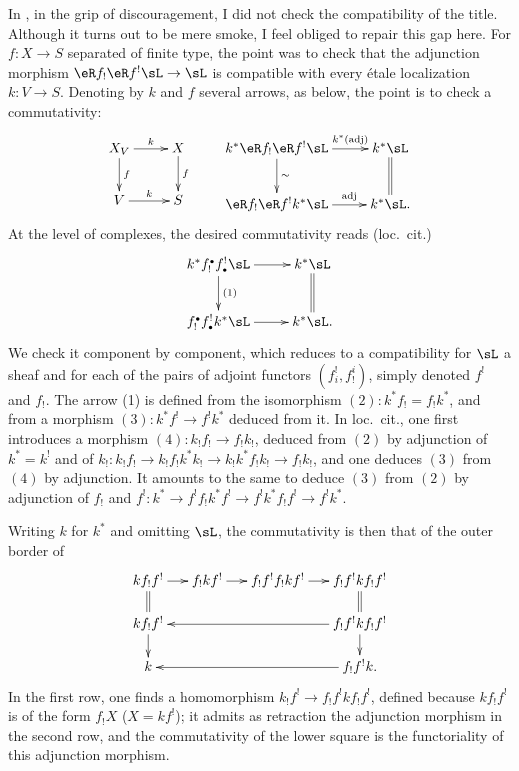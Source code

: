 In \cite[XVIII]{sga4}, in the grip of discouragement, I did not check
the compatibility of the title. Although it turns out to be mere smoke, I feel
obliged to repair this gap here. For $f:X\to S$ separated of finite
type, the point was to check that the adjunction morphism
$\eR f_!\eR f^!\sL\to \sL$ is compatible with every \'etale localization
$k:V\to S$. Denoting by $k$ and $f$ several arrows, as below,
the point is to check a commutativity:
\[\xymatrix{
  X_V \ar[r]^-k \ar[d]^-f
    & X \ar[d]^-f \\
  V \ar[r]^-k
    & S
} \qquad
\xymatrix{
  k^\ast \eR f_! \eR f^!\sL \ar[r]^-{k^\ast(\text{adj})} \ar[d]^-\sim
    & k^\ast \sL \ar@{=}[d] \\
  \eR f_! \eR f^! k^\ast \sL \ar[r]^-{\text{adj}}
    & k^\ast \sL \text{.}
}\]
At the level of complexes, the desired commutativity reads (loc.\ cit.)
\[\xymatrix{
  k^\ast f_!^\bullet f^!_\bullet \sL \ar[r] \ar[d]^-{(1)}
    & k^\ast \sL \ar@{=}[d] \\
  f_!^\bullet f^!_\bullet k^\ast \sL \ar[r]
    & k^\ast \sL \text{.}
}\]
We check it component by component, which reduces to a
compatibility for $\sL$ a sheaf and for each of the pairs of adjoint
functors $(f_i^!,f_!^i)$, simply denoted $f^!$ and $f_!$. The arrow (1)
is defined from the isomorphism $(2):k^\ast f_!=f_! k^\ast$, and from a
morphism $(3):k^\ast f^! \to f^! k^\ast$ deduced from it. In loc.\ cit., one
first introduces a morphism $(4):k_! f_!\to f_! k_!$, deduced from $(2)$ by
adjunction of $k^\ast=k^!$ and of
$k_!:k_! f_!\to k_! f_! k^\ast k_!\to k_! k^\ast f_! k_! \to f_! k_!$, and one
deduces $(3)$ from $(4)$ by adjunction. It amounts to the same to deduce $(3)$
from $(2)$ by adjunction of $f_!$ and
$f^!:k^\ast \to f^! f_! k^\ast f^!\to f^! k^\ast f_! f^! \to f^! k^\ast$.

Writing $k$ for $k^\ast$ and omitting $\sL$, the commutativity is then
that of the outer border of
\[\xymatrix@=.5cm{
  k f_! f^! \ar[r] \ar@{=}[d]
    & f_! k f^! \ar[r]
    & f_! f^! f_! k f^! \ar[r]
    & f_! f^! k f_! f^! \ar@{=}[d] \\
  k f_! f^! \ar[d]
    & & & \ar[lll] f_! f^! k f_! f^! \ar[d] \\
  k
    & & & \ar[lll] f_! f^! k \text{.}
}\]
In the first row, one finds a homomorphism
$k _! f^! \to f_! f^! k f_! f^!$, defined because $k f_! f^!$ is of the
form $f_! X$ ($X=k f^!$); it admits as retraction the
adjunction morphism in the second row, and the commutativity of the lower square is
the functoriality of this adjunction morphism.



